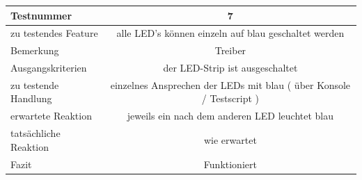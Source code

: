 \documentclass[]{article}
\begin{document}
\begin{longtable}[]{@{}lc@{}}
\toprule
\begin{minipage}[b]{0.25\columnwidth}\raggedright\strut
Testnummer\strut
\end{minipage} & \begin{minipage}[b]{0.55\columnwidth}\centering\strut
7\strut
\end{minipage}\tabularnewline
\midrule
\endhead
\begin{minipage}[t]{0.25\columnwidth}\raggedright\strut
zu testendes Feature\strut
\end{minipage} & \begin{minipage}[t]{0.55\columnwidth}\centering\strut
alle LED's können einzeln auf blau geschaltet werden\strut
\end{minipage}\tabularnewline
\begin{minipage}[t]{0.25\columnwidth}\raggedright\strut
Bemerkung\strut
\end{minipage} & \begin{minipage}[t]{0.55\columnwidth}\centering\strut
Treiber\strut
\end{minipage}\tabularnewline
\begin{minipage}[t]{0.25\columnwidth}\raggedright\strut
Ausgangskriterien\strut
\end{minipage} & \begin{minipage}[t]{0.55\columnwidth}\centering\strut
der LED-Strip ist ausgeschaltet\strut
\end{minipage}\tabularnewline
\begin{minipage}[t]{0.25\columnwidth}\raggedright\strut
zu testende Handlung\strut
\end{minipage} & \begin{minipage}[t]{0.55\columnwidth}\centering\strut
einzelnes Ansprechen der LEDs mit blau ( über Konsole / Testscript
)\strut
\end{minipage}\tabularnewline
\begin{minipage}[t]{0.25\columnwidth}\raggedright\strut
erwartete Reaktion\strut
\end{minipage} & \begin{minipage}[t]{0.55\columnwidth}\centering\strut
jeweils ein nach dem anderen LED leuchtet blau\strut
\end{minipage}\tabularnewline
\begin{minipage}[t]{0.25\columnwidth}\raggedright\strut
tatsächliche Reaktion\strut
\end{minipage} & \begin{minipage}[t]{0.55\columnwidth}\centering\strut
wie erwartet\strut
\end{minipage}\tabularnewline
\begin{minipage}[t]{0.25\columnwidth}\raggedright\strut
Fazit\strut
\end{minipage} & \begin{minipage}[t]{0.55\columnwidth}\centering\strut
Funktioniert\strut
\end{minipage}\tabularnewline
\bottomrule
\end{longtable}
\end{document}
